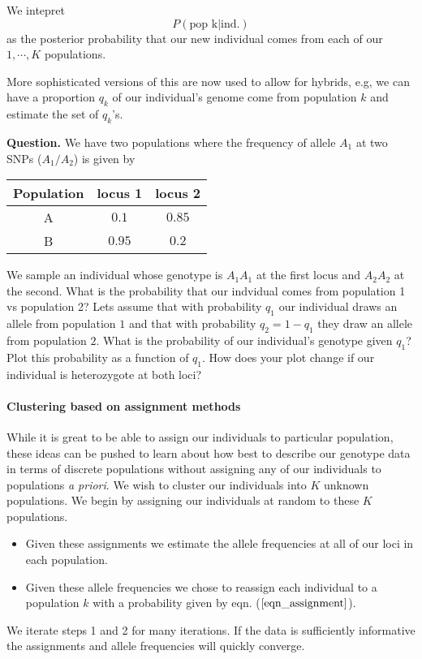 We intepret 
\begin{equation}
 P(\textrm{pop k} | \textrm{ind.})
\end{equation}
as the posterior probability that our new individual comes from each of our $1,\cdots, K$ populations.

More sophisticated versions of this are now used to allow for hybrids,
e.g, we can have a proportion $q_k$ of our individual's genome come
from population $k$ and estimate the set of $q_k$'s.

{\bf Question.} We have two populations where the frequency of allele
$A_1$ at two SNPs ($A_1/A_2$)  is given by
\begin{center}
\begin{tabular}{|ccc|}
\hline
Population & locus 1 & locus 2 \\
\hline
A & $0.1$ & $0.85$ \\
B  & $0.95$ & $0.2$ \\
\hline
\end{tabular}
\end{center}
We sample an individual whose genotype is $A_1A_1$ at the first locus
and $A_2A_2$ at the second. What
is the probability that our indvidual comes from population 1 vs
population 2?
Lets assume that with probability $q_1$ our individual draws an allele
from population $1$ and that with probability $q_2=1-q_1$ they draw an allele from
population $2$. What is the probability of our individual's genotype
given $q_1$? Plot this probability as a function of $q_1$. How does 
your plot change if our individual is heterozygote at both loci?
 

\paragraph{Clustering based on assignment methods}
While it is great to be able to assign our individuals to particular
population, these ideas can be pushed to learn about how best to
describe our genotype data in terms of discrete populations without
assigning any of our individuals to populations {\it a priori}. 
We wish to cluster our individuals into $K$ unknown populations. We begin by assigning our individuals at random to these $K$ populations. 
\begin{itemize}
\item Given these assignments we estimate the allele frequencies at all of our loci in each population. 
\item Given these allele frequencies we chose to reassign each individual to a population $k$ with a probability given by eqn. ($\ref{eqn_assignment}$).
\end{itemize}
We iterate steps 1 and 2 for many iterations. If the data is sufficiently informative the assignments and allele frequencies will quickly converge. 

